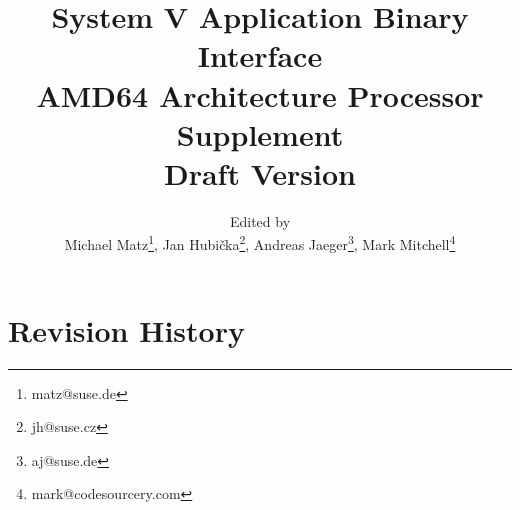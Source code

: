 \documentclass[12pt]{report}
\begin{document}
\author{Edited by\\
  Michael Matz\thanks{matz@suse.de},
  Jan Hubi\v{c}ka\thanks{jh@suse.cz}, Andreas Jaeger\thanks{aj@suse.de},
  Mark Mitchell\thanks{mark@codesourcery.com}}

\title{System V Application Binary Interface\\
{\Large AMD64 Architecture Processor Supplement\\
Draft Version \version}}
\maketitle
\tableofcontents
\listoftables
\listoffigures

\section*{Revision History}
\end{document}
